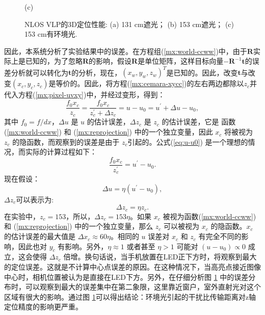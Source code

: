 \begin{figure}[!t]
\begin{minipage}{0.5\linewidth}
                  \centerline{(c)}
                \end{minipage}
                \vfill
                \caption{NLOS VLP的3D定位性能: (a) 131 cm遮光； (b) 153 cm遮光； (c) 153 cm有环境光.}
                \label{fig:errors-3D}
 \end{figure}

因此，本系统分析了实验结果中的误差。在方程组(\ref{mx:world-ccww})中，由于$\mathbf{R}$实际上是已知的，为了忽略$\mathbf{R}$的影响，假设$\mathbf{R}$是单位矩阵，这样目标向量$-\mathbf{R}^{-1} \mathbf{t} $的误差分析就可以转化为$\mathbf{t}$的分析，现在，$(x_w,y_w,z_w )^T$是已知的。因此，改变$\mathbf{t}$与改变$(x_c,y_c,z_c)$是等价的。因此，将方程(\ref{mx:cemara-xycc})的左右两边都除以$z_c$并代入方程(\ref{mx:pixel-uvxy})中，并经过变形，得到：
    \begin{equation}\label{eq:u-u0}
                \frac{f_{0}x_{c}}{z_{c}}=\frac{f_{0}x_{c}}{z_{c}^{'}+\Delta z_{c}}=u-u_{0}=u^{'}+\Delta u-u_{0},
    \end{equation}
其中 $f_0=f/dx$，$\Delta u$ 是 $u$ 的估计误差，$\Delta z_c$ 是 $z_c$ 的估计误差，它是 函数(\ref{mx:world-ccww}) 和 (\ref{mx:reprojection}) 中的一个独立变量，因此 $x_c$ 将被视为 $z_c$ 的隐函数，而观察到的误差是由于 $z_c$引起的。公式(\ref{eq:u-u0}) 是一个理想的情况，而实际的计算过程如下：
     \begin{equation}\label{eq:u'-u0}
                \frac{f_{0}x_{c}}{z_{c}^{'}}=u^{'}-u_{0}.
  \end{equation}
 现在假设：
     \begin{equation}\label{eq:delta u}
        \Delta u= \eta (u^{'}-u_{0}),
    \end{equation}   
$\Delta z_{c}$可以表示为:
     \begin{equation}\label{eq:delta zc}
    \Delta z_{c}=\eta z_{c}.
\end{equation}
在实验中，$z_{c}=153$，所以，$\Delta z_c=153 \eta$。如果 $x_c$ 被视为函数(\ref{mx:world-ccww}) 和 (\ref{mx:reprojection}) 中的一个独立变量，那么 $z_c$ 可以被视为 $x_c$ 的隐函数。$x_c$ 的估计误差的最大值是 $ \Delta x_c \approx60 \eta$。相同的 $u$ 误差对 $x_c$ 和 $z_c$ 有完全不同的影响，因此也对 $y_c$ 有影响。另外，$\eta \approx 1$ 或者甚至 $\eta>1$ 可能对 $(u-u_0)\propto 0$ 成立，这会使得 $ \Delta z_c$ 倍增。换句话说，当手机放置在LED正下方时，将观察到最大的定位误差。这就是不计算中心点误差的原因。在这种情况下，当高亮点接近图像中心时，相机位置被认为是直接在LED下方。另外，在仔细分析图 \ref{fig:errors-3D} 中的误差分布时，可以观察到最大的误差集中在第二象限，这里靠近窗户，室外直射光对这个区域有很大的影响。通过图 \ref{fig:errors-3D}可以得出结论：环境光引起的干扰比传输距离对z轴定位精度的影响更严重。

